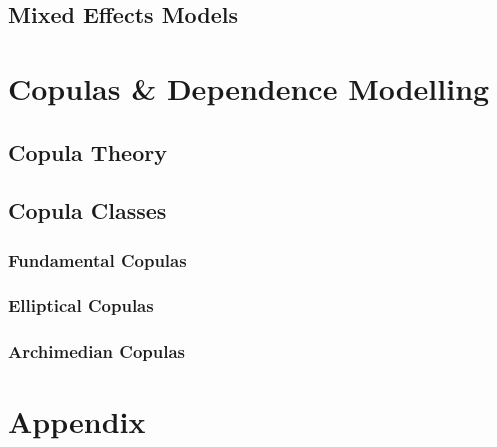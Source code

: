 \documentclass[12pt]{article}
\numberwithin{equation}{section}
\numberwithin{table}{section}
\numberwithin{figure}{section}
\begin{document}
\subsection{Mixed Effects Models} \label{ssec:mixed_models}

%
\clearpage

\section{Copulas \& Dependence Modelling} \label{sec:copulas_and_dependence_moelling}

\subsection{Copula Theory} \label{ssec:copula_theory}

\subsection{Copula Classes} \label{ssec:copula_classes}

\subsubsection{Fundamental Copulas} \label{sssec:fundamental_copulas}
%
\subsubsection{Elliptical Copulas} \label{sssec:elliptical_copulas}
%
\subsubsection{Archimedian Copulas} \label{sssec:archimedian_copulas}
%




\clearpage





%


\section*{Appendix} \label{sec:appendix}

\clearpage
\end{document}
